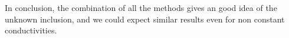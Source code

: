 \documentclass[10pt, a4paper, twoside, openright]{book}
\theoremstyle{definition}
\theoremstyle{plain}
\theoremstyle{plain}
\theoremstyle{plain}
\theoremstyle{plain}
\theoremstyle{plain}
\theoremstyle{plain}
\theoremstyle{plain}
\theoremstyle{plain}
\begin{document}
In conclusion, the combination of all the methods gives an good idea of the unknown 
inclusion, and we could expect similar results even for non constant conductivities.

\printbibliography %
\end{document}

